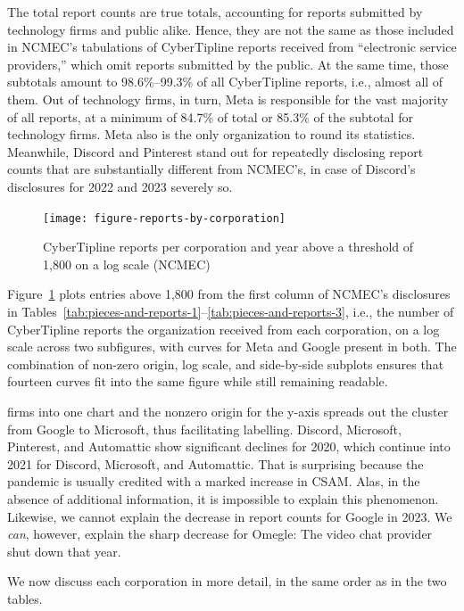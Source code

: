 \documentclass[nonacm,screen]{acmart}
\begin{document}
\begin{itemize}
The total report counts are true totals, accounting for reports submitted by
technology firms and public alike. Hence, they are not the same as those
included in NCMEC's tabulations of CyberTipline reports received from
``electronic service providers,'' which omit reports submitted by the public. At
the same time, those subtotals amount to 98.6\%--99.3\% of all CyberTipline
reports, i.e., almost all of them. Out of technology firms, in turn, Meta is
responsible for the vast majority of all reports, at a minimum of 84.7\% of
total or 85.3\% of the subtotal for technology firms. Meta also is the only
organization to round its statistics. Meanwhile, Discord and Pinterest stand out
for repeatedly disclosing report counts that are substantially different from
NCMEC's, in case of Discord's disclosures for 2022 and 2023 severely so.

\begin{figure}
\centering\libertineLF
\texttt{[image: figure-reports-by-corporation]}
\caption{CyberTipline reports per corporation and year above a threshold of
 1,800 on a log scale (NCMEC)}
\label{fig:reports-by-corp}
\end{figure}

Figure~\ref{fig:reports-by-corp} plots entries above 1,800 from the first column
of NCMEC's disclosures in
Tables~\ref{tab:pieces-and-reports-1}--\ref{tab:pieces-and-reports-3}, i.e., the
number of CyberTipline reports the organization received from each corporation,
on a log scale across two subfigures, with curves for Meta and Google present in
both. The combination of non-zero origin, log scale, and side-by-side subplots
ensures that fourteen curves fit into the same figure while still remaining
readable.


firms into one chart and the nonzero origin for the y-axis spreads out the
cluster from Google to Microsoft, thus facilitating labelling. Discord,
Microsoft, Pinterest, and Automattic show significant declines for 2020, which
continue into 2021 for Discord, Microsoft, and Automattic. That is surprising
because the pandemic is usually credited with a marked increase in
CSAM. Alas, in the absence of additional information, it is
impossible to explain this phenomenon. Likewise, we cannot explain the decrease
in report counts for Google in 2023. We \emph{can}, however, explain the sharp
decrease for Omegle: The video chat provider shut down that year.

We now discuss each corporation in more detail, in the same order as in the two
tables.





\end{itemize}
\end{document}
